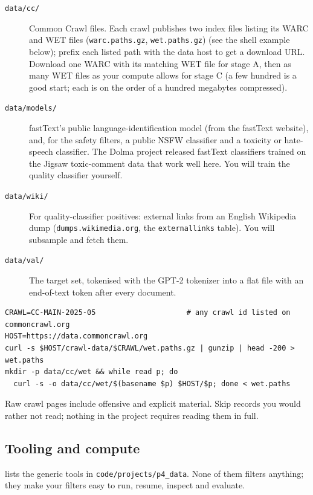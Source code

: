 \begin{description}
  \item[\texttt{data/cc/}] Common Crawl files. Each crawl publishes two index files
  listing its WARC and WET files (\texttt{warc.paths.gz}, \texttt{wet.paths.gz}) (see the shell example
  below); prefix each listed path with the data host to get a download URL. Download
  one WARC with its matching WET file for stage A, then as many WET files as your compute allows for
  stage C (a few hundred is a good start; each is on the order of a hundred megabytes compressed).
  \item[\texttt{data/models/}] fastText's public language-identification model 
  (from the fastText website), and, for the safety filters, a public NSFW classifier and a toxicity or
  hate-speech classifier. The Dolma project released fastText classifiers trained on the Jigsaw
  toxic-comment data that work well here. You will train the quality classifier yourself.
  \item[\texttt{data/wiki/}] For quality-classifier positives: external links from an English
  Wikipedia dump (\texttt{dumps.wikimedia.org}, the \texttt{externallinks} table). You will
  subsample and fetch them.
  \item[\texttt{data/val/}] The target set, tokenised with the GPT-2 tokenizer into a flat
   file with an end-of-text token after every document.
\end{description}

\begin{lstlisting}[style=shell]
CRAWL=CC-MAIN-2025-05                     # any crawl id listed on commoncrawl.org
HOST=https://data.commoncrawl.org
curl -s $HOST/crawl-data/$CRAWL/wet.paths.gz | gunzip | head -200 > wet.paths
mkdir -p data/cc/wet && while read p; do
  curl -s -o data/cc/wet/$(basename $p) $HOST/$p; done < wet.paths
\end{lstlisting}

\begin{pitfall}
Raw crawl pages include offensive and explicit material. Skip records you would rather not read;
nothing in the project requires reading them in full.
\end{pitfall}

\subsection{Tooling and compute}

 lists the generic tools in \texttt{code/projects/p4\_data}. None of them filters
anything; they make your filters easy to run, resume, inspect and evaluate.

